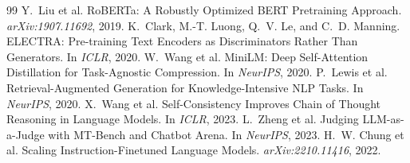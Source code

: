 \documentclass[sigconf,nonacm]{acmart}
\begin{document}
\begin{thebibliography}{99}
 Y.~Liu et al. RoBERTa: A Robustly Optimized BERT Pretraining Approach. {\em arXiv:1907.11692}, 2019.
 K.~Clark, M.-T. Luong, Q.~V. Le, and C.~D. Manning. ELECTRA: Pre-training Text Encoders as Discriminators Rather Than Generators. In {\em ICLR}, 2020.
 W.~Wang et al. MiniLM: Deep Self-Attention Distillation for Task-Agnostic Compression. In {\em NeurIPS}, 2020.
 P.~Lewis et al. Retrieval-Augmented Generation for Knowledge-Intensive NLP Tasks. In {\em NeurIPS}, 2020.
 X.~Wang et al. Self-Consistency Improves Chain of Thought Reasoning in Language Models. In {\em ICLR}, 2023.
 L.~Zheng et al. Judging LLM-as-a-Judge with MT-Bench and Chatbot Arena. In {\em NeurIPS}, 2023.
 H.~W. Chung et al. Scaling Instruction-Finetuned Language Models. {\em arXiv:2210.11416}, 2022.
\end{thebibliography}
\end{document}
